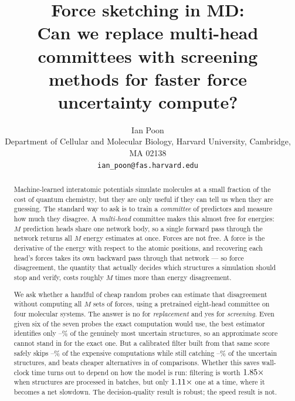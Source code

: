 \documentclass{article}
\title{Force sketching in MD:\\
Can we replace multi-head committees with screening\\
methods for faster force uncertainty compute?}
\author{%
  Ian Poon \\
  Department of Cellular and Molecular Biology, Harvard University, Cambridge, MA 02138 \\
  \texttt{ian\_poon@fas.harvard.edu} \\
}
\begin{document}
\maketitle

\begin{abstract}
Machine-learned interatomic potentials simulate molecules at a small fraction of the cost of quantum
chemistry, but they are only useful if they can tell us when they are guessing. The standard way to
ask is to train a \emph{committee} of predictors and measure how much they disagree. A
\emph{multi-head} committee makes this almost free for energies: $M$ prediction heads share one
network body, so a single forward pass through the network returns all $M$ energy estimates at once.
Forces are not free. A force is the derivative of the energy with respect to the atomic positions,
and recovering each head's forces takes its own backward pass through that network --- so force
disagreement, the quantity that actually decides which structures a simulation should stop and
verify, costs roughly $M$ times more than energy disagreement.

We ask whether a handful of cheap random probes can estimate that disagreement without computing all
$M$ sets of forces, using a pretrained eight-head committee on four molecular systems. The answer is
no for \emph{replacement} and yes for \emph{screening}. Even given six of the seven probes the exact
computation would use, the best estimator identifies only
\fsMaxRecallKSixLoPct--\fsMaxRecallKSixHiPct\% of the genuinely most uncertain structures, so an
approximate score cannot stand in for the exact one. But a calibrated filter built from that same
score safely skips \fsGateCVSkipLoPct--\fsGateCVSkipHiPct\% of the expensive computations while
still catching \fsGateCVRecallLoPct--\fsGateCVRecallHiPct\% of the uncertain structures, and beats
cheaper
alternatives in \fsGateCVDominates{} of \fsGateCVComparisons{} comparisons. Whether this saves
wall-clock time turns out to depend on how the model is run: filtering is worth
$1.85\times$ when structures are processed in batches, but only
$1.11\times$ one at a time, where it becomes a net slowdown. The decision-quality
result is robust; the speed result is not.
\end{abstract}
\end{document}
